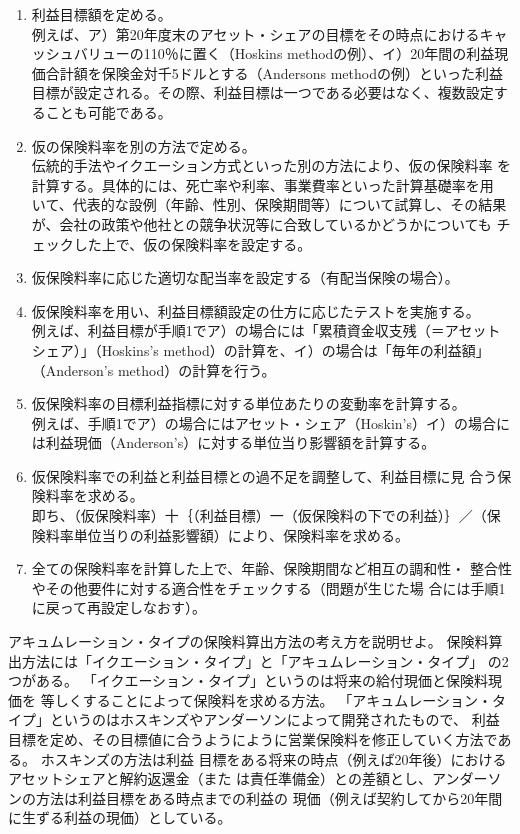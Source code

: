 \documentclass[report,gutter=10mm,fore-edge=10mm,uplatex,dvipdfmx]{jlreq}
\begin{document}
\begin{enumerate}
 \item 利益目標額を定める。\\
例えば、ア）第20年度末のアセット・シェアの目標をその時点におけるキャッシュバリューの110％に置く（Hoskins methodの例）、イ）20年間の利益現価合計額を保険金対千5ドルとする（Andersons methodの例）といった利益目標が設定される。その際、利益目標は一つである必要はなく、複数設定することも可能である。
 \item 仮の保険料率を別の方法で定める。\\
伝統的手法やイクエーション方式といった別の方法により、仮の保険料率
を計算する。具体的には、死亡率や利率、事業費率といった計算基礎率を用
いて、代表的な設例（年齢、性別、保険期間等）について試算し、その結果
が、会社の政策や他社との競争状況等に合致しているかどうかについても
チェックした上で、仮の保険料率を設定する。
 \item 仮保険料率に応じた適切な配当率を設定する（有配当保険の場合）。
 \item 仮保険料率を用い、利益目標額設定の仕方に応じたテストを実施する。\\
例えば、利益目標が手順1でア）の場合には「累積資金収支残（＝アセット
シェア）」（Hoskins’s method）の計算を、イ）の場合は「毎年の利益額」
（Anderson’s method）の計算を行う。
 \item 仮保険料率の目標利益指標に対する単位あたりの変動率を計算する。\\
例えば、手順1でア）の場合にはアセット・シェア（Hoskin's）イ）の場合に
は利益現価（Anderson’s）に対する単位当り影響額を計算する。
 \item 仮保険料率での利益と利益目標との過不足を調整して、利益目標に見
合う保険料率を求める。\\
即ち、（仮保険料率）十｛（利益目標）一（仮保険料の下での利益）｝／（保
険料率単位当りの利益影響額）により、保険料率を求める。
 \item 全ての保険料率を計算した上で、年齢、保険期間など相互の調和性・
整合性やその他要件に対する適合性をチェックする（問題が生じた場
合には手順1に戻って再設定しなおす）。
\end{enumerate}

アキュムレーション・タイプの保険料算出方法の考え方を説明せよ。
保険料算出方法には「イクエーション・タイプ」と「アキュムレーション・タイプ」
の2つがある。
「イクエーション・タイプ」というのは将来の給付現価と保険料現価を
等しくすることによって保険料を求める方法。
「アキュムレーション・タイプ」というのはホスキンズやアンダーソンによって開発されたもので、
利益目標を定め、その目標値に合うようにように営業保険料を修正していく方法である。
ホスキンズの方法は利益
目標をある将来の時点（例えば20年後）におけるアセットシェアと解約返還金（また
は責任準備金）との差額とし、アンダーソンの方法は利益目標をある時点までの利益の
現価（例えば契約してから20年間に生ずる利益の現価）としている。
\end{document}
